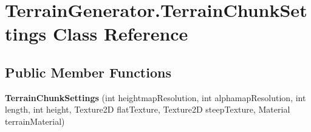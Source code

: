 \hypertarget{class_terrain_generator_1_1_terrain_chunk_settings}{}\section{Terrain\+Generator.\+Terrain\+Chunk\+Settings Class Reference}
\label{class_terrain_generator_1_1_terrain_chunk_settings}
\subsection*{Public Member Functions}
\begin{DoxyCompactItemize}
\item 
\mbox{\label{class_terrain_generator_1_1_terrain_chunk_settings_a70b08b759821d504c3a3be0bfdc71d63}} 
{\bfseries Terrain\+Chunk\+Settings} (int heightmap\+Resolution, int alphamap\+Resolution, int length, int height, Texture2D flat\+Texture, Texture2D steep\+Texture, Material terrain\+Material)
\end{DoxyCompactItemize}
